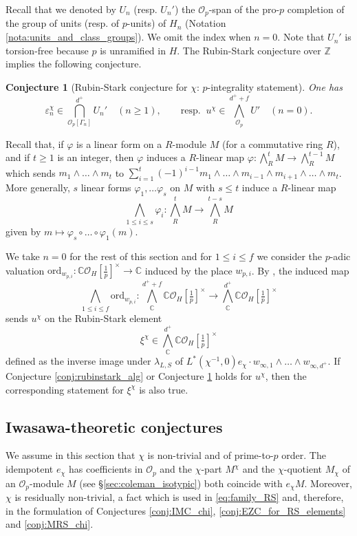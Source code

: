 \documentclass[12pt]{amsart}
\newcommand\bC{\mathbb{C}}
\newcommand\bZ{\mathbb{Z}}
\newcommand\cO{\mathcal{O}}
\newcommand{\ord}{\mathrm{ord}}
\theoremstyle{defstyle}
\theoremstyle{thmstyle}
\newtheorem{conjecture}[subsubsection]{Conjecture}
\begin{document}
Recall that we denoted by $U_n$ (resp. $U_n'$) the $\cO_p$-span of the pro-$p$ completion of the group of units (resp. of $p$-units) of $H_n$ (Notation \ref{nota:units_and_class_groups}). We omit the index when $n=0$. Note that $U_n'$ is torsion-free because $p$ is unramified in $H$. The Rubin-Stark conjecture over $\bZ$ \cite[Conjecture B']{rubinstark} implies the following conjecture.

\begin{conjecture}[Rubin-Stark conjecture for $\chi$: $p$-integrality statement]\label{conj:rubinstark_p_int}
	One has 
	$$\varepsilon_n^\chi \in {\bigcap}^{d^+}_{\cO_p[\Gamma_n]} U_n' \quad (n\geq 1), \qquad \textrm{resp. } \ u^\chi \in {\bigwedge}^{d^++f}_{\cO_p} U' \quad (n=0).
	$$
\end{conjecture}
Recall that, if $\varphi$ is a linear form on a $R$-module $M$ (for a commutative ring $R$), and if $t\geq 1$ is an integer, then $\varphi$ induces a $R$-linear map $\varphi : {\bigwedge}^t_R M \longrightarrow {\bigwedge}^{t-1}_R M$ which sends $m_1\wedge\ldots\wedge m_t$ to $\sum_{i=1}^t(-1)^{i-1}m_1\wedge\ldots\wedge m_{i-1}\wedge m_{i+1}\wedge\ldots\wedge m_t$. More generally, $s$ linear forms $\varphi_1,\ldots\varphi_s$ on $M$ with $s\leq t$ induce a $R$-linear map 
$$\bigwedge_{1\leq i\leq s} \varphi_i : {\bigwedge}^t_R M \longrightarrow {\bigwedge}^{t-s}_R M$$ 
given by $m\mapsto \varphi_s \circ \ldots \circ \varphi_1 (m)$.

We take $n=0$ for the rest of this section and for $1\leq i \leq f$ we consider the $p$-adic valuation $\ord_{w_{p,i}} : \bC\cO_H[\tfrac{1}{p}]^\times \longrightarrow \bC$ induced by the place ${w_{p,i}}$. By \cite[Prop. 3.6]{sanocompositio}, the induced map
$$\bigwedge_{1 \leq i \leq f} \ord_{w_{p,i}} : {\bigwedge}_\bC^{d^++f} \bC\cO_H[\tfrac{1}{p}]^\times \longrightarrow {\bigwedge}_\bC^{d^+} \bC\cO_H[\tfrac{1}{p}]^\times$$
sends $u^\chi$ on the Rubin-Stark element 
\begin{equation}\label{eq:xi^chi}
	\xi^\chi\in {\bigwedge}_\bC^{d^+} \bC\cO_H[\tfrac{1}{p}]^\times
\end{equation}
 defined as the inverse image under $\lambda_{L,S}$ of $L^*(\chi^{-1},0)e_\chi \cdot w_{\infty,1}\wedge \ldots \wedge w_{\infty,d^+}$. If Conjecture \ref{conj:rubinstark_alg} or Conjecture \ref{conj:rubinstark_p_int} holds for $u^\chi$, then the corresponding statement for $\xi^\chi$ is also true.
\subsection{Iwasawa-theoretic conjectures}
We assume in this section that $\chi$ is non-trivial and of prime-to-$p$ order. The idempotent $e_\chi$ has coefficients in $\cO_p$ and the $\chi$-part $M^\chi$ and the $\chi$-quotient $M_\chi$ of an $\cO_p$-module $M$ (see \S\ref{sec:coleman_isotypic}) both coincide with $e_\chi M$. Moreover, $\chi$ is residually non-trivial, a fact which is used in \eqref{eq:family_RS} and, therefore, in the formulation of Conjectures \ref{conj:IMC_chi}, \ref{conj:EZC_for_RS_elements} and \ref{conj:MRS_chi}.
\end{document}
